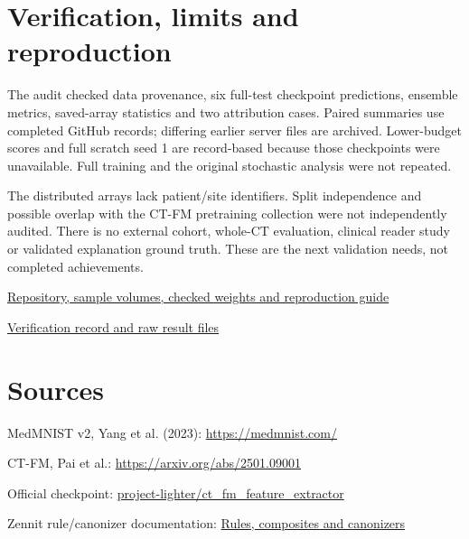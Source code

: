 \documentclass[11pt,a4paper]{article}
\begin{document}
\section*{Verification, limits and reproduction}
The audit checked data provenance, six full-test checkpoint predictions, ensemble metrics, saved-array statistics and two attribution cases. Paired summaries use completed GitHub records; differing earlier server files are archived. Lower-budget scores and full scratch seed 1 are record-based because those checkpoints were unavailable. Full training and the original stochastic analysis were not repeated.

The distributed arrays lack patient/site identifiers. Split independence and possible overlap with the CT-FM pretraining collection were not independently audited. There is no external cohort, whole-CT evaluation, clinical reader study or validated explanation ground truth. These are the next validation needs, not completed achievements.

\href{https://github.com/Joana-Mansa/ct-fm-lrp-uncertainty}{Repository, sample volumes, checked weights and reproduction guide}\par
\href{https://github.com/Joana-Mansa/ct-fm-lrp-uncertainty/blob/main/docs/verification.md}{Verification record and raw result files}

\section*{Sources}
{\small
MedMNIST v2, Yang et al. (2023): \url{https://medmnist.com/}\par
CT-FM, Pai et al.: \url{https://arxiv.org/abs/2501.09001}\par
Official checkpoint: \href{https://huggingface.co/project-lighter/ct_fm_feature_extractor}{project-lighter/ct\_fm\_feature\_extractor}\par
Zennit rule/canonizer documentation: \href{https://zennit.readthedocs.io/en/stable/how-to/use-rules-composites-and-canonizers.html}{Rules, composites and canonizers}
}
\end{document}
